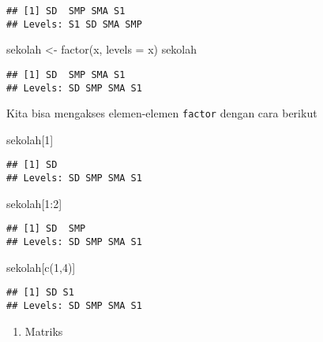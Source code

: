 \documentclass[
]{book}
\newenvironment{Shaded}{\begin{snugshade}}{\end{snugshade}}
\newcommand{\AttributeTok}[1]{\textcolor[rgb]{0.77,0.63,0.00}{#1}}
\newcommand{\DecValTok}[1]{\textcolor[rgb]{0.00,0.00,0.81}{#1}}
\newcommand{\FunctionTok}[1]{\textcolor[rgb]{0.00,0.00,0.00}{#1}}
\newcommand{\NormalTok}[1]{#1}
\newcommand{\OtherTok}[1]{\textcolor[rgb]{0.56,0.35,0.01}{#1}}
\newcommand{\SpecialCharTok}[1]{\textcolor[rgb]{0.00,0.00,0.00}{#1}}
\providecommand{\tightlist}{%
  \setlength{\itemsep}{0pt}\setlength{\parskip}{0pt}}
\begin{document}
\begin{verbatim}
## [1] SD  SMP SMA S1 
## Levels: S1 SD SMA SMP
\end{verbatim}

\begin{Shaded}
\begin{Highlighting}[]
\NormalTok{sekolah }\OtherTok{\textless{}{-}} \FunctionTok{factor}\NormalTok{(x, }\AttributeTok{levels =}\NormalTok{ x)}
\NormalTok{sekolah}
\end{Highlighting}
\end{Shaded}

\begin{verbatim}
## [1] SD  SMP SMA S1 
## Levels: SD SMP SMA S1
\end{verbatim}

Kita bisa mengakses elemen-elemen \texttt{factor} dengan cara berikut

\begin{Shaded}
\begin{Highlighting}[]
\NormalTok{sekolah[}\DecValTok{1}\NormalTok{] }
\end{Highlighting}
\end{Shaded}

\begin{verbatim}
## [1] SD
## Levels: SD SMP SMA S1
\end{verbatim}

\begin{Shaded}
\begin{Highlighting}[]
\NormalTok{sekolah[}\DecValTok{1}\SpecialCharTok{:}\DecValTok{2}\NormalTok{]}
\end{Highlighting}
\end{Shaded}

\begin{verbatim}
## [1] SD  SMP
## Levels: SD SMP SMA S1
\end{verbatim}

\begin{Shaded}
\begin{Highlighting}[]
\NormalTok{sekolah[}\FunctionTok{c}\NormalTok{(}\DecValTok{1}\NormalTok{,}\DecValTok{4}\NormalTok{)]}
\end{Highlighting}
\end{Shaded}

\begin{verbatim}
## [1] SD S1
## Levels: SD SMP SMA S1
\end{verbatim}

\begin{enumerate}
\def\labelenumi{\arabic{enumi}.}
\setcounter{enumi}{2}
\tightlist
\item
  Matriks
\end{enumerate}
\end{document}

